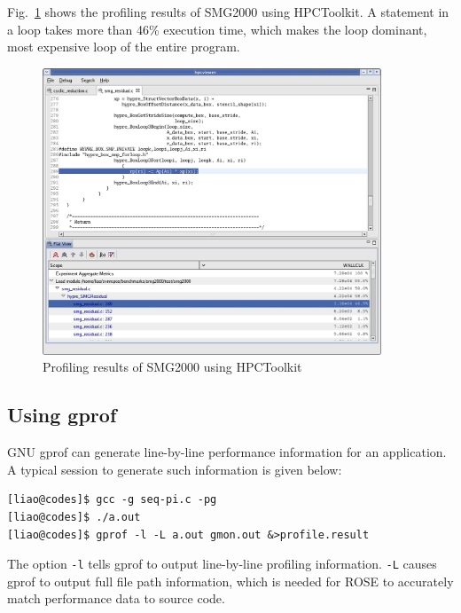 Fig.~\ref{fig:hpctoolkitSmg2000} shows the profiling results of SMG2000
using HPCToolkit. 
A statement in a loop takes more than 46\% execution time, which makes the
loop dominant, most expensive loop of the entire program.
\begin{figure}[htbp]  
	\centering
		\includegraphics[width=0.9\textwidth]{hpctoolkit-smg2000.png}
	\caption{Profiling results of SMG2000 using HPCToolkit}
	\label{fig:hpctoolkitSmg2000}
\end{figure}

\subsection{Using gprof}
GNU gprof can generate line-by-line performance information for an
application. A typical session to generate such information is given below:
\begin{verbatim}
[liao@codes]$ gcc -g seq-pi.c -pg
[liao@codes]$ ./a.out
[liao@codes]$ gprof -l -L a.out gmon.out &>profile.result
\end{verbatim}

The option {\tt -l} tells gprof to output line-by-line profiling
information. 
{\tt -L} causes gprof to output full file path information, which is needed
for ROSE to accurately match performance data to source code.

